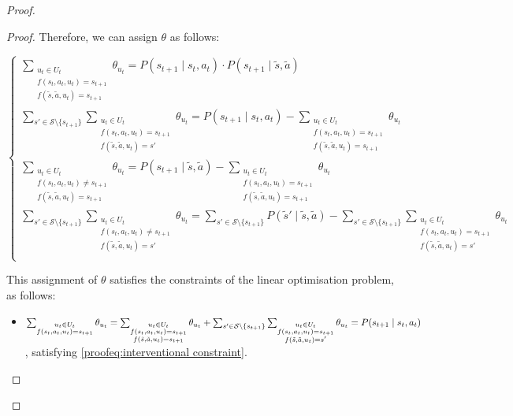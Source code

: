 \begin{proof}
\begin{proof}
    Therefore, we can assign $\theta$ as follows:
    
    \[
    \begin{cases}
        \sum_{\substack{u_t \in U_t \\f(s_t, a_t, u_t) = s_{t+1} \\ f(\tilde{s}, \tilde{a}, u_t) = s_{t+1}}}{\theta_{u_t}} = P(s_{t+1} \mid s_t, a_t) \cdot P(s_{t+1} \mid \tilde{s}, \tilde{a})\\
        \sum_{s' \in \mathcal{S}\setminus\{s_{t+1}\}}\sum_{\substack{u_t \in U_t \\f(s_t, a_t, u_t) = s_{t+1} \\ f(\tilde{s}, \tilde{a}, u_t) = s'}}{\theta_{u_t}} = P(s_{t+1} \mid s_t, a_t) - \sum_{\substack{u_t \in U_t \\f(s_t, a_t, u_t) = s_{t+1} \\ f(\tilde{s}, \tilde{a}, u_t) = s_{t+1}}}{\theta_{u_t}}\\
        \sum_{\substack{u_t \in U_t \\f(s_t, a_t, u_t) \neq s_{t+1} \\ f(\tilde{s}, \tilde{a}, u_t) = s_{t+1}}}{\theta_{u_t}} = P(s_{t+1} \mid \tilde{s}, \tilde{a}) - \sum_{\substack{u_t \in U_t \\f(s_t, a_t, u_t) = s_{t+1} \\ f(\tilde{s}, \tilde{a}, u_t) = s_{t+1}}}{\theta_{u_t}} \\
        \sum_{s' \in \mathcal{S}\setminus\{ s_{t+1}\}}\sum_{\substack{u_t \in U_t \\f(s_t, a_t, u_t) \neq s_{t+1} \\ f(\tilde{s}, \tilde{a}, u_t) = s'}}{\theta_{u_t}} = \sum_{s' \in \mathcal{S}\setminus\{ s_{t+1}\}}P(\tilde{s}' \mid \tilde{s}, \tilde{a}) - \sum_{s' \in \mathcal{S}\setminus\{s_{t+1}\}}\sum_{\substack{u_t \in U_t \\f(s_t, a_t, u_t) = s_{t+1} \\ f(\tilde{s}, \tilde{a}, u_t) = s'}}{\theta_{u_t}}\\
    \end{cases}
    \]
   
    This assignment of $\theta$ satisfies the constraints of the linear optimisation problem, as follows:

    \begin{itemize}        
    \item $\sum_{\substack{u_t \in U_t \\f(s_t, a_t, u_t) = s_{t+1}}} \theta_{u_t} = \sum_{\substack{u_t \in U_t \\f(s_t, a_t, u_t) = s_{t+1} \\ f(\tilde{s}, \tilde{a}, u_t) = s_{t+1}}} \theta_{u_t} + \sum_{s' \in \mathcal{S}\setminus\{ s_{t+1}\}}\sum_{\substack{u_t \in U_t \\f(s_t, a_t, u_t) = s_{t+1} \\ f(\tilde{s}, \tilde{a}, u_t) = s'}}{\theta_{u_t}} \\ = P(s_{t+1} \mid s_t, a_t)$, satisfying \eqref{proofeq:interventional constraint}.


\end{itemize}
\end{proof}
\end{proof}
